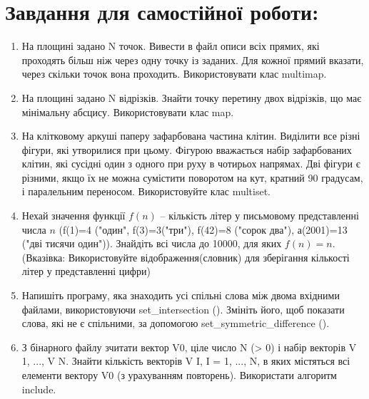 \documentclass[a5paper,titlepage,openany,twoside,draft]{book_unv}%
\begin{document}
\section{Завдання для самостійної роботи:}

\begin{enumerate}
\def\labelenumi{\arabic{enumi})}
\setcounter{enumi}{3}
\item
  На площині задано N точок. Вивести в файл описи всіх прямих, які
  проходять більш ніж через одну точку із заданих. Для кожної прямий
  вказати, через скільки точок вона проходить. Використовувати клас
  multimap.
\item
  На площині задано N відрізків. Знайти точку перетину двох відрізків,
  що має мінімальну абсцису. Використовувати клас map.
\item
  На клітковому аркуші паперу зафарбована частина клітин. Виділити все
  різні фігури, які утворилися при цьому. Фігурою вважається набір
  зафарбованих клітин, які сусідні один з одного при руху в чотирьох
  напрямах. Дві фігури є різними, якщо їх не можна сумістити поворотом
  на кут, кратний 90 градусам, і паралельним переносом. Використовуйте
  клас multiset.
\item
  Нехай значення функції $f(n)$ -- кількість літер у письмовому
  представленні числа $n$ (f(1)=4 ("один", f(3)=3("три"), f(42)=8
  ("сорок два"), а(2001)=13 ("дві тисячи один")). Знайдіть всі числа до
  10000, для яких $f(n) = n$. (Вказівка: Використовуйте
  відображення(словник) для зберігання кількості літер у представленні
  цифри)

\item
  Напишіть програму, яка знаходить усі спільні слова між двома вхідними
  файлами, використовуючи set\_intersection (). Змініть його, щоб
  показати слова, які не є спільними, за допомогою
  set\_symmetric\_difference ().

\item
З бінарного файлу зчитати вектор V0, ціле число N (> 0) і набір векторів
V 1, ..., V N.  Знайти кількість векторів V I,
I = 1, ..., N, в яких містяться всі елементи вектору V0 (з урахуванням повторень). 
Використати алгоритм include.


\end{enumerate}
\end{document}
